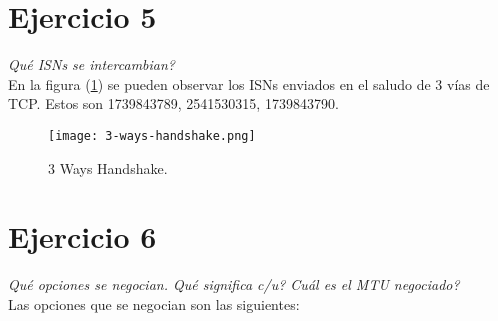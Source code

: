 \documentclass[osajnl,twocolumn,showpacs,superscriptaddress,10pt]{revtex4-1} %
\begin{document}
\section{Ejercicio 5}

\textit{Qué ISNs se intercambian?} \\

En la figura (\ref{3-ways-handshake}) se pueden observar los ISNs enviados en el saludo de 3 vías de TCP.
Estos son 1739843789, 2541530315, 1739843790.

\begin{figure}[H]
    \centering
    \texttt{[image: 3-ways-handshake.png]}
    \caption{3 Ways Handshake.}
    \label{3-ways-handshake}
\end{figure}

\newpage

\section{Ejercicio 6}

\textit{Qué opciones se negocian. Qué significa c/u? Cuál es el MTU negociado?} \\

Las opciones que se negocian son las siguientes:
\end{document}
